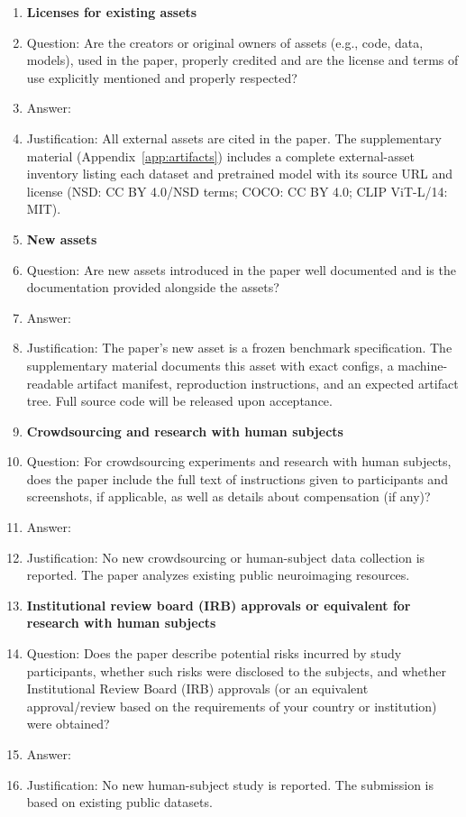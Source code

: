 \begin{enumerate}
\item {\bf Licenses for existing assets}
    \item[] Question: Are the creators or original owners of assets (e.g., code, data, models), used in the paper, properly credited and are the license and terms of use explicitly mentioned and properly respected?
    \item[] Answer: \answerYes{}
    \item[] Justification: All external assets are cited in the paper.  The supplementary material (Appendix~\ref{app:artifacts}) includes a complete external-asset inventory listing each dataset and pretrained model with its source URL and license (NSD: CC BY 4.0/NSD terms; COCO: CC BY 4.0; CLIP ViT-L/14: MIT).

\item {\bf New assets}
    \item[] Question: Are new assets introduced in the paper well documented and is the documentation provided alongside the assets?
    \item[] Answer: \answerYes{}
    \item[] Justification: The paper's new asset is a frozen benchmark specification.  The supplementary material documents this asset with exact configs, a machine-readable artifact manifest, reproduction instructions, and an expected artifact tree.  Full source code will be released upon acceptance.

\item {\bf Crowdsourcing and research with human subjects}
    \item[] Question: For crowdsourcing experiments and research with human subjects, does the paper include the full text of instructions given to participants and screenshots, if applicable, as well as details about compensation (if any)?
    \item[] Answer: \answerNA{}
    \item[] Justification: No new crowdsourcing or human-subject data collection is reported.  The paper analyzes existing public neuroimaging resources.

\item {\bf Institutional review board (IRB) approvals or equivalent for research with human subjects}
    \item[] Question: Does the paper describe potential risks incurred by study participants, whether such risks were disclosed to the subjects, and whether Institutional Review Board (IRB) approvals (or an equivalent approval/review based on the requirements of your country or institution) were obtained?
    \item[] Answer: \answerNA{}
    \item[] Justification: No new human-subject study is reported.  The submission is based on existing public datasets.


\end{enumerate}

